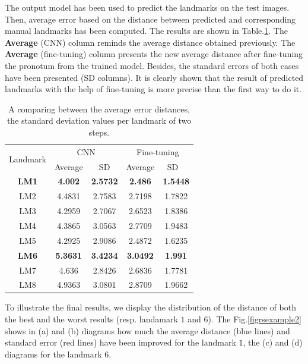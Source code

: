 \documentclass[10pt]{article}
\begin{document}
The output model has been used to predict the landmarks on the test
images. Then, average error based on the distance between
predicted and corresponding manual landmarks has been computed. The results
are shown in Table.\ref{tab2}. The \textbf{Average} (CNN) column reminds
the average distance obtained previously. The \textbf{Average} (fine-tuning)
column presents the new average distance
after fine-tuning the pronotum from the trained model. Besides, the standard errors of both cases have been presented (SD columns). It is
clearly shown that the result of predicted landmarks with the help of
fine-tuning is more precise than the first way to do it.

\begin{table}[htbp]
\centering
\begin{tabular}{ | c | c | c | c | c | }
\hline
	\multicolumn{1}{|c|}{\multirow{2}{*}{Landmark}} & \multicolumn{2}{c|}{CNN} &  \multicolumn{2}{c|}{Fine-tuning}  \\ \cline{2-5}
	 & Average & SD & Average & SD \  \\ \hline
	\textbf{LM1} & \textbf{4.002} & \textbf{2.5732} & \textbf{2.486} & \textbf{1.5448} \\ \hline
	LM2 & 4.4831 & 2.7583 & 2.7198 & 1.7822 \\ \hline
	LM3 & 4.2959 & 2.7067 & 2.6523 & 1.8386 \\ \hline
	LM4 & 4.3865 & 3.0563 & 2.7709 & 1.9483 \\ \hline
	LM5 & 4.2925 & 2.9086 & 2.4872 & 1.6235 \\ \hline
	\textbf{LM6} & \textbf{5.3631} & \textbf{3.4234} & \textbf{3.0492} & \textbf{1.991} \\ \hline
	LM7 & 4.636 & 2.8426 & 2.6836 & 1.7781 \\ \hline
	LM8 & 4.9363 & 3.0801 & 2.8709 & 1.9662 \\ \hline
\end{tabular}
\caption{\small{A comparing between the average error distances, the standard deviation values per landmark of two steps.}}
\label{tab2}
\end{table}

To illustrate the final results, we display the distribution of the
distance of both the best and the worst results (resp. landamark $1$
and $6$). The Fig.\ref{figrsexample2} shows in (a) and (b) diagrams
 how much the average distance (blue lines) and standard error (red lines) have
 been improved for the landmark $1$, the (c) and (d) diagrams for the
 landmark $6$.
\end{document}
